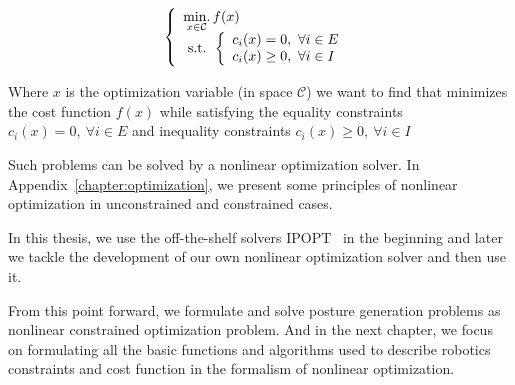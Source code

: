 \begin{equation}
\label{eq:optim_form_PG}
  \left\{
  \begin{array}{l}
    \operatorname*{min.}\limits_{x\in\mathcal{C}}{f(x)}\\
    \text{ s.t. }
    \left\{
    \begin{array}{l}
      c_i(x) = 0,\ \forall i\in{E}\\
      c_i(x) \geq 0,\ \forall i\in{I}\\
    \end{array}
    \right.
  \end{array}
  \right.
\end{equation}

Where $x$ is the optimization variable (in space $\mathcal{C}$) we want to find that minimizes the cost function $f(x)$ while satisfying the equality constraints $c_i(x) = 0,\ \forall i\in{E}$ and inequality constraints $c_i(x) \geq 0,\ \forall i\in{I}$

Such problems can be solved by a nonlinear optimization solver.
In Appendix~\ref{chapter:optimization}, we present some principles of nonlinear optimization in unconstrained and constrained cases.

In this thesis, we use the off-the-shelf solvers IPOPT~\cite{wachter:mathprog:2006} in the beginning and later we tackle the development of our own nonlinear optimization solver and then use it.

From this point forward, we formulate and solve posture generation problems as nonlinear constrained optimization problem.
And in the next chapter, we focus on formulating all the basic functions and algorithms used to describe robotics constraints and cost function in the formalism of nonlinear optimization.
